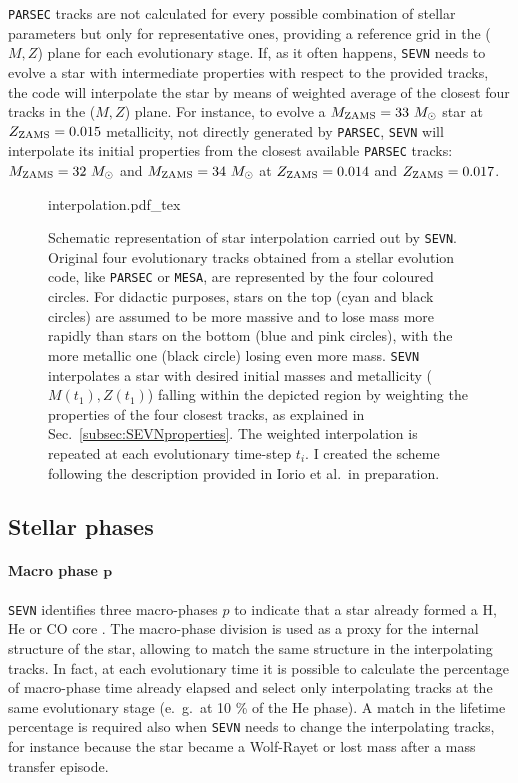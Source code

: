\documentclass[a4paper,titlepage]{book}     	%
\newcommand{\sun}{\ensuremath{_\odot}}
\newcommand{\mzams}{M_\textup{ZAMS}}
\newcommand{\zzams}{Z_\textup{ZAMS}}
\newcommand{\msun}{\ensuremath{M\sun}}
\begin{document}
\texttt{PARSEC} tracks are not calculated for every possible combination of stellar parameters but only for representative ones, providing a reference grid in the ($M,Z$) plane for each evolutionary stage. If, as it often happens, \texttt{SEVN} needs to evolve a star with intermediate properties with respect to the provided tracks, the code will interpolate the star by means of weighted average of the closest four tracks in the ($M,Z$) plane. For instance, to evolve a $\mzams = 33~\msun$ star at $\zzams=0.015$ metallicity, not directly generated by \texttt{PARSEC}, \texttt{SEVN} will interpolate its initial properties from the closest available \texttt{PARSEC} tracks: $\mzams = 32~\msun$ and $\mzams = 34~\msun$ at $\zzams = 0.014$ and $\zzams = 0.017$.


\begin{figure}
	\centering
	\def\svgwidth{0.5\textwidth}
	{interpolation.pdf_tex} 
	\caption{Schematic representation of star interpolation carried out by \texttt{SEVN}. Original four evolutionary tracks obtained from a stellar evolution code, like \texttt{PARSEC} or \texttt{MESA}, are represented by the four coloured circles. For didactic purposes, stars on the top (cyan and black circles) are assumed to be more massive and to lose mass more rapidly than stars on the bottom (blue and pink circles), with the more metallic one (black circle) losing even more mass. \texttt{SEVN} interpolates a star with desired initial masses and metallicity ($M(t_1),Z(t_1)$) falling within the depicted region by weighting the properties of the four closest tracks, as explained in Sec.\ \ref{subsec:SEVNproperties}. The weighted interpolation is repeated at each evolutionary time-step $t_i$. I created the scheme following the description provided in Iorio et al.\ in preparation.}\label{fig:SEVNinterpolation}
\end{figure}






\subsection{Stellar phases}\label{subsec:stellarphasesSEVN}
\paragraph{Macro phase $\boldsymbol{p}$} \texttt{SEVN} identifies three macro-phases $p$ to indicate that a star already formed a H, He or CO core \cite{spera2019_mergingBBH}. The macro-phase division is used as a proxy for the internal structure of the star, allowing to match the same structure in the interpolating tracks. In fact, at each evolutionary time it is possible to calculate the percentage of macro-phase time already elapsed and select only interpolating tracks at the same evolutionary stage (e.\ g.\ at 10 \% of the He phase). A match in the lifetime percentage is required also when \texttt{SEVN} needs to change the interpolating tracks, for instance because the star became a Wolf-Rayet or lost mass after a mass transfer episode. 
\end{document}
